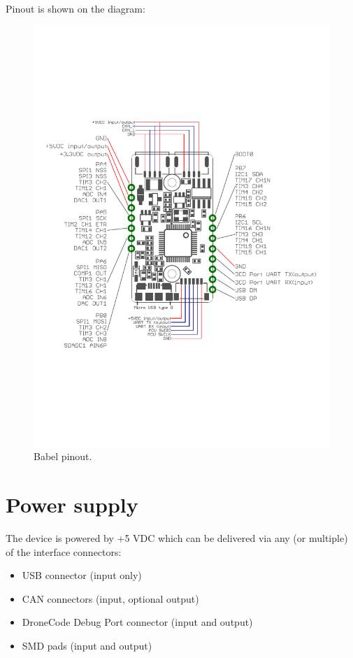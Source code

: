 \documentclass{zubaxdoc}
\begin{document}
Pinout is shown on the diagram:
\begin{figure}[!hbt]
	\centerline{\includegraphics[width=1\textwidth]{babel_pinout}}
	\caption{Babel pinout.\label{pinout}}
\end{figure}

\chapter{Power supply}

The device is powered by +5 VDC which can be delivered via any (or multiple) of the interface connectors:
\begin{itemize}
\item USB connector (input only)
\item CAN connectors (input, optional output)
\item DroneCode Debug Port connector (input and output)
\item SMD pads (input and output)
\end{itemize}
\end{document}
